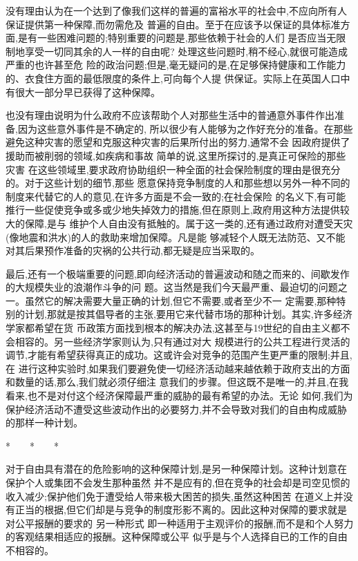 ﻿\documentclass[12pt]{article}
\begin{document}
没有理由认为在一个达到了像我们这样的普遍的富裕水平的社会中,不应向所有人保证提供第一种保障,而勿需危及
普遍的自由。至于在应该予以保证的具体标准方面,是有一些困难问题的;特别重要的问题是,那些依赖于社会的人们
是否应当无限制地享受一切同其余的人一样的自由呢? 处理这些问题时,稍不经心,就很可能造成严重的也许甚至危
险的政治问题;但是,毫无疑问的是,在足够保持健康和工作能力的、衣食住方面的最低限度的条件上,可向每个人提
供保证。实际上在英国人口中有很大一部分早已获得了这种保障。

也没有理由说明为什么政府不应该帮助个人对那些生活中的普通意外事件作出准备,因为这些意外事件是不确定的,
所以很少有人能够为之作好充分的准备。在那些避免这种灾害的愿望和克服这种灾害的后果所付出的努力,通常不会
因政府提供了援助而被削弱的领域,如疾病和事故 \myrule 简单的说,这里所探讨的,是真正可保险的那些灾害
\myrule 在这些领域里,要求政府协助组织一种全面的社会保险制度的理由是很充分的。对于这些计划的细节,那些
愿意保持竞争制度的人和那些想以另外一种不同的制度来代替它的人的意见,在许多方面是不会一致的;在社会保险
的名义下,有可能推行一些促使竞争或多或少地失掉效力的措施,但在原则上,政府用这种方法提供较大的保障,是与
维护个人自由没有抵触的。属于这一类的,还有通过政府对遭受天灾(像地震和洪水)的人的救助来增加保障。凡是能
够减轻个人既无法防范、又不能对其后果预作准备的灾祸的公共行动,都无疑是应当采取的。

最后,还有一个极端重要的问题,即向经济活动的普遍波动和随之而来的、间歇发作的大规模失业的浪潮作斗争的问
题。这当然是我们今天最严重、最迫切的问题之一。虽然它的解决需要大量正确的计划,但它不需要,或者至少不一
定需要,那种特别的计划,那就是按其倡导者的主张,要用它来代替市场的那种计划。其实,许多经济学家都希望在货
币政策方面找到根本的解决办法,这甚至与19世纪的自由主义都不会相容的。另一些经济学家则认为,只有通过对大
规模进行的公共工程进行灵活的调节,才能有希望获得真正的成功。这或许会对竞争的范围产生更严重的限制;并且,在
进行这种实验时,如果我们要避免使一切经济活动越来越依赖于政府支出的方面和数量的话,那么,我们就必须仔细注
意我们的步骤。但这既不是唯一的,并且,在我看来,也不是对付这个经济保障最严重的威胁的最有希望的办法。无论
如何,我们为保护经济活动不遭受这些波动作出的必要努力,并不会导致对我们的自由构成威胁的那样一种计划。

*　　*　　*

对于自由具有潜在的危险影响的这种保障计划,是另一种保障计划。这种计划意在保护个人或集团不会发生那种虽然
并不是应有的,但在竞争的社会却是司空见惯的收入减少;保护他们免于遭受给人带来极大困苦的损失,虽然这种困苦
在道义上并没有正当的根据,但它们却是与竞争的制度形影不离的。因此这种对保障的要求就是对公平报酬的要求的
另一种形式 \myrule 即一种适用于主观评价的报酬,而不是和个人努力的客观结果相适应的报酬。这种保障或公平
似乎是与个人选择自已的工作的自由不相容的。
\end{document}
